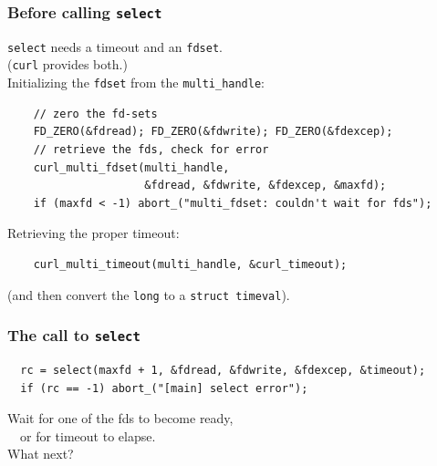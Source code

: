\begin{frame}[fragile]
  \frametitle{Before calling {\tt select}}

  
    {\tt select} needs a timeout and an {\tt fdset}. \\
    \qquad ({\tt curl} provides both.)\\[1em]

    Initializing the {\tt fdset} from the {\tt multi\_handle}:
  

\begin{lstlisting}
    // zero the fd-sets
    FD_ZERO(&fdread); FD_ZERO(&fdwrite); FD_ZERO(&fdexcep);
    // retrieve the fds, check for error
    curl_multi_fdset(multi_handle, 
                     &fdread, &fdwrite, &fdexcep, &maxfd);
    if (maxfd < -1) abort_("multi_fdset: couldn't wait for fds");
\end{lstlisting}

  
    Retrieving the proper timeout:
  
\begin{lstlisting}
    curl_multi_timeout(multi_handle, &curl_timeout);
\end{lstlisting}
  
    (and then convert the {\tt long} to a {\tt struct timeval}).
  

\end{frame}

\begin{frame}[fragile]
  \frametitle{The call to {\tt select}}

\begin{lstlisting}
  rc = select(maxfd + 1, &fdread, &fdwrite, &fdexcep, &timeout);
  if (rc == -1) abort_("[main] select error");
\end{lstlisting}

  
    Wait for one of the fds to become ready,\\ ~~or for timeout to elapse. \\[1em]
    What next?\\
  
\end{frame}

